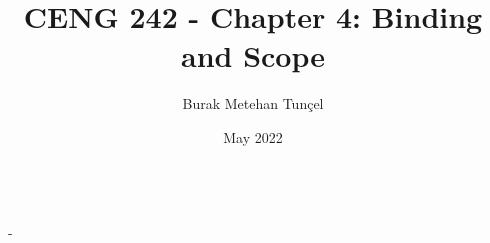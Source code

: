 \documentclass{article}
\title{CENG 242 - Chapter 4: Binding and Scope}
\author{Burak Metehan Tunçel}
\date{May 2022}
\makeatletter
\renewcommand\maketitle{
{\raggedright %
\begin{center}
{\Large \bfseries \@title}\\[2ex] 
{\large \@author \ - \@date}\\[2ex]
\end{center}}} %
\makeatother
\begin{document}
\maketitle

\begin{multicols*}{2}
\setlength{\columnsep}{1.5cm}
\setlength{\columnseprule}{0.2pt}











\end{multicols*}
\end{document}
